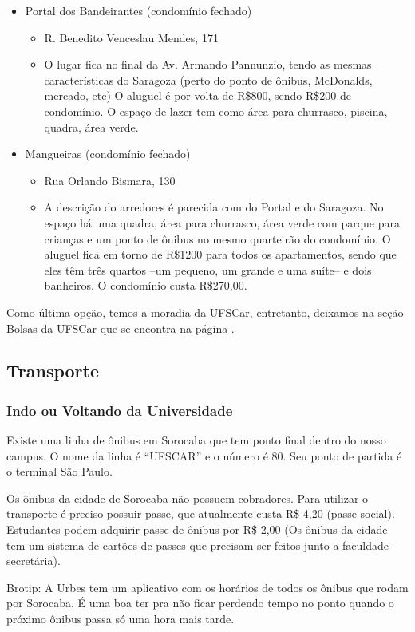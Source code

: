 \begin{itemize}
  \item Portal dos Bandeirantes (condomínio fechado)
    \begin{itemize}
      \item R. Benedito Venceslau Mendes, 171
      \item O lugar fica no final da Av. Armando Pannunzio, tendo as mesmas características do Saragoza (perto do ponto de ônibus, McDonalds, mercado, etc) O aluguel é por volta de R\$800, sendo R\$200 de condomínio. O espaço de lazer tem como área para churrasco, piscina, quadra, área verde.
    \end{itemize}
  \item Mangueiras (condomínio fechado)
    \begin{itemize}
      \item Rua Orlando Bismara, 130
      \item A descrição do arredores é parecida com do Portal e do Saragoza. No espaço há uma quadra, área para churrasco, área verde com parque para crianças e um ponto de ônibus no mesmo quarteirão do condomínio. O aluguel fica em torno de R\$1200 para todos os apartamentos, sendo que eles têm três quartos --um pequeno, um grande e uma suíte-- e dois banheiros. O condomínio custa R\$270,00.
    \end{itemize}
\end{itemize}

Como última opção, temos a moradia da UFSCar, entretanto,  deixamos na seção Bolsas da UFSCar que se encontra na página \pageref{moradia}.

\subsection{Transporte}
\subsubsection{Indo ou Voltando da Universidade}
Existe uma linha de ônibus em Sorocaba que tem ponto final dentro do nosso campus. O nome da linha é “UFSCAR” e o número é 80. Seu ponto de partida é o terminal São Paulo.

Os ônibus da cidade de Sorocaba não possuem cobradores. Para utilizar o transporte é preciso possuir passe, que atualmente custa R\$ 4,20 (passe social). Estudantes podem adquirir passe de ônibus por R\$ 2,00 (Os ônibus da cidade tem um sistema de cartões de passes que precisam ser feitos junto a faculdade - secretária).

Brotip: A Urbes tem um aplicativo com os horários de todos os ônibus que rodam por Sorocaba. É uma boa ter pra não ficar perdendo tempo no ponto quando o próximo ônibus passa só uma hora mais tarde.

